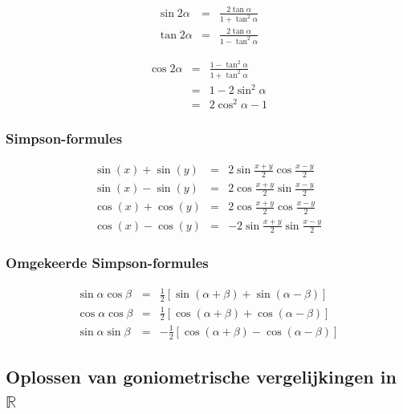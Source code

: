 \begin{minipage}[b]{0.5\linewidth}
\begin{eqnarray*}
\sin2\alpha &=& \frac{2\tan\alpha}{1+\tan^2\alpha}\\
\tan2\alpha &=& \frac{2\tan \alpha}{1-\tan^2\alpha}
\end{eqnarray*}
\end{minipage}
\hspace{0.5cm}
\begin{minipage}[b]{0.5\linewidth}
\begin{eqnarray*}
\cos2\alpha &=& \frac{1-\tan^2\alpha}{1+\tan^2\alpha}\\
&=& 1-2\sin^2\alpha\\
&=& 2\cos^2\alpha-1
\end{eqnarray*}
\end{minipage}

\subsubsection{Simpson-formules}

\begin{eqnarray*}
\sin(x)+\sin(y)&=&2\sin\frac{x+y}{2}\cos\frac{x-y}{2}\\
\sin(x)-\sin(y)&=&2\cos\frac{x+y}{2}\sin\frac{x-y}{2}\\
\cos(x)+\cos(y)&=&2\cos\frac{x+y}{2}\cos\frac{x-y}{2}\\
\cos(x)-\cos(y)&=&-2\sin\frac{x+y}{2}\sin\frac{x-y}{2}
\end{eqnarray*}

\subsubsection{Omgekeerde Simpson-formules}

\begin{eqnarray*}
\sin\alpha\cos\beta&=&\frac{1}{2}\left[\sin(\alpha + \beta)+\sin(\alpha - \beta)\right]\\
\cos\alpha\cos\beta&=&\frac{1}{2}\left[\cos(\alpha + \beta)+\cos(\alpha - \beta)\right]\\
\sin\alpha\sin\beta&=&-\frac{1}{2}\left[\cos(\alpha + \beta)-\cos(\alpha - \beta)\right]
\end{eqnarray*}

\subsection{Oplossen van goniometrische vergelijkingen in $\mathbb{R}$}

